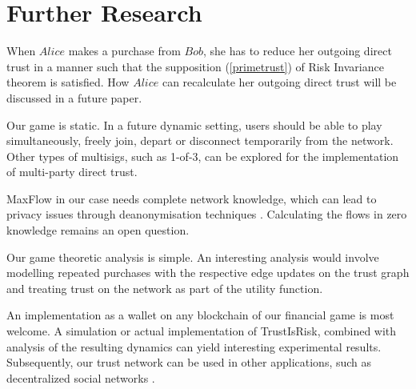 \section{Further Research}

      When $Alice$ makes a purchase from $Bob$, she has to reduce her outgoing direct trust in a manner such that the
      supposition (\ref{primetrust}) of Risk Invariance theorem is satisfied. How $Alice$ can recalculate her outgoing
      direct trust will be discussed in a future paper.

      Our game is static. In a future dynamic setting, users should be able to play simultaneously, freely join, depart or
      disconnect temporarily from the network. Other types of multisigs, such as 1-of-3, can be explored for the
      implementation of multi-party direct trust.

      MaxFlow in our case needs complete network knowledge, which can lead to privacy issues through deanonymisation
      techniques \cite{deanonymisation}. Calculating the flows in zero knowledge remains an open question.

      Our game theoretic analysis is simple. An interesting analysis would involve modelling repeated purchases with the
      respective edge updates on the trust graph and treating trust on the network as part of the utility function.

      An implementation as a wallet on any blockchain of our financial game is most welcome. A simulation or actual
      implementation of TrustIsRisk, combined with analysis of the resulting dynamics can yield interesting experimental
      results. Subsequently, our trust network can be used in other applications, such as decentralized social networks
      \cite{synereo}.

